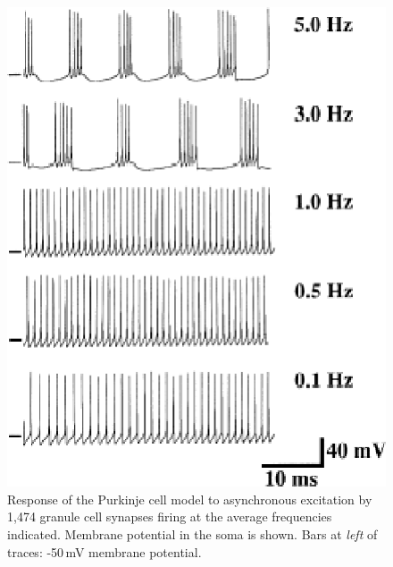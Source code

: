 \documentclass[12pt]{article}
\begin{document}
\begin{figure}[h]
\centering
   \includegraphics[scale=0.75]{figures/Fig.2.6.eps}
   \caption{Response of the Purkinje cell model to asynchronous excitation by 1,474 granule cell synapses firing at the average frequencies indicated. Membrane potential in the soma is shown. Bars at {\em left} of traces: -50\,mV membrane potential.}
   \label{fig:DS2.6}
\end{figure}

\clearpage
\end{document}
